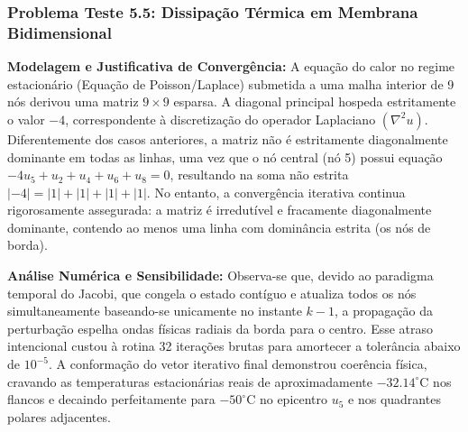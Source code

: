 \subsubsection{Problema Teste 5.5: Dissipação Térmica em Membrana Bidimensional}

\textbf{Modelagem e Justificativa de Convergência:} A equação do calor no regime estacionário (Equação de Poisson/Laplace) submetida a uma malha interior de 9 nós derivou uma matriz $9 \times 9$ esparsa. A diagonal principal hospeda estritamente o valor $-4$, correspondente à discretização do operador Laplaciano $(\nabla^2 u)$. Diferentemente dos casos anteriores, a matriz não é estritamente diagonalmente dominante em todas as linhas, uma vez que o nó central (nó 5) possui equação $-4u_5 + u_2 + u_4 + u_6 + u_8 = 0$, resultando na soma não estrita $|-4| = |1|+|1|+|1|+|1|$. No entanto, a convergência iterativa continua rigorosamente assegurada: a matriz é irredutível e fracamente diagonalmente dominante, contendo ao menos uma linha com dominância estrita (os nós de borda).

\begin{table}[H]
\centering
\caption{Decaimento Espacial das Temperaturas (Problema 5.5 - Gauss-Jacobi)}
\label{tab:jacobi_prob55}
\end{table}

\textbf{Análise Numérica e Sensibilidade:} Observa-se que, devido ao paradigma temporal do Jacobi, que congela o estado contíguo e atualiza todos os nós simultaneamente baseando-se unicamente no instante $k-1$, a propagação da perturbação espelha ondas físicas radiais da borda para o centro. Esse atraso intencional custou à rotina 32 iterações brutas para amortecer a tolerância abaixo de $10^{-5}$. A conformação do vetor iterativo final demonstrou coerência física, cravando as temperaturas estacionárias reais de aproximadamente $-32.14^\circ \text{C}$ nos flancos e decaindo perfeitamente para $-50^\circ \text{C}$ no epicentro $u_5$ e nos quadrantes polares adjacentes.

